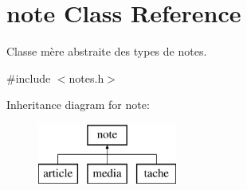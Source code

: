 \hypertarget{classnote}{}\section{note Class Reference}
\label{classnote}


Classe mère abstraite des types de notes.  




{\ttfamily \#include $<$notes.\+h$>$}

Inheritance diagram for note\+:\begin{figure}[H]
\begin{center}
\leavevmode
\includegraphics[height=2.000000cm]{classnote}
\end{center}
\end{figure}
